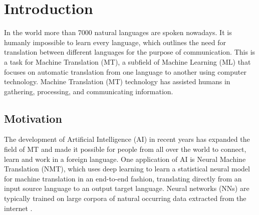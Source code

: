 \chapter{Introduction}
\label{ch:Introduction}





In the world more than 7000 natural languages are spoken nowadays. It is humanly impossible to learn every language, which outlines the need for translation between different languages for the purpose of communication. This is a task for Machine Translation (MT), a subfield of Machine Learning (ML) that focuses on automatic translation from one language to another using computer technology. Machine Translation (MT) technology has assisted humans in gathering, processing, and communicating information.  

\section{Motivation}
\label{sec:Introduction:Motivation}

The development of Artificial Intelligence (AI) in recent years has expanded the field of MT and made it possible for people from all over the world to connect, learn and work in a foreign language. One application of AI is Neural Machine Translation (NMT), which uses deep learning to learn a statistical neural model for machine translation in an end-to-end fashion, translating directly from an input source language to an output target language. Neural networks (NNs) are typically trained on large corpora of natural occurring data extracted from the internet \parencite{NMT}. 

